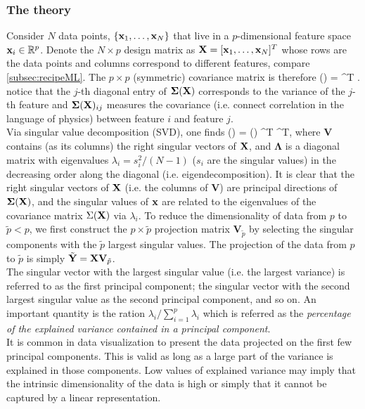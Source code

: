 \subsubsection{The theory}
\label{subsubsec:dimRedPCAtheory}
Consider $N$ data points, $\{\mathbf{x}_1,\dots,\mathbf{x}_N\}$ that live in a $p$-dimensional feature space $\mathbf{x}_i \in \mathbb{R}^p$. Denote the $N\times p$ design matrix as $\mathbf{X} = [\mathbf{x}_1,\dots,\mathbf{x}_N]^T$ whose rows are the data points and columns correspond to different features, compare \ref{subsec:recipeML}. The $p\times p$ (symmetric) covariance matrix is therefore 
\be 
\label{eq:dimRedPCAcovMatrix}
\mathbf{\Sigma}(\mX) =  \mX^T \mX.
\ee 
notice that the $j$-th diagonal entry of $\mathbf{\Sigma}(\mathbf{X})$ corresponds to the variance of the $j$-th feature and $\mathbf{\Sigma}(\mathbf{X})_{ij}$ measures the covariance (i.e. connect correlation in the language of physics) between feature $i$ and feature $j$.\\
Via singular value decomposition (SVD), one finds
\be 
\mathbf{\Sigma}(\mX) =  \left(\right) ^T \equiv {}\mathbf{\Lambda} ^T,
\ee 
where $\mathbf{V}$ contains (as its columns) the right singular vectors of $\mathbf{X}$, and $\mathbf{\Lambda}$ is a diagonal matrix with eigenvalues $\lambda_i =s^2_i/(N-1)$ ($s_i$ are the singular values) in the decreasing order along the diagonal (i.e. eigendecomposition). It is clear that the right singular vectors of $\mathbf{X}$ (i.e. the columns of $\mathbf{V}$) are principal directions of $\mathbf{\Sigma}(\mathbf{X})$, and the singular values of $\mathbf{x}$ are related to the eigenvalues of the covariance matrix $\Sigma(\mathbf{X})$ via $\lambda_i$. To reduce the dimensionality of data from $p$ to $\tilde{p}<p$, we first construct the $p\times \tilde{p}$ projection matrix $\mathbf{V}_{\tilde{p}}$ by selecting the singular components with the $\tilde{p}$ largest singular values. The projection of the data from $p$ to $\tilde{p}$ is simply $\tilde{\mathbf{Y}}=\mathbf{X} \mathbf{V}_{\tilde{p}}$. \\
The singular vector with the largest singular value (i.e. the largest variance) is referred to as the first principal component; the singular vector with the second largest singular value as the second principal component, and so on. An important quantity is the ration $\lambda_i/\sum_{i=1}^p \lambda_i$ which is referred as the \emph{percentage of the explained variance contained in a principal component}.\\
It is common in data visualization to present the data projected on the first few principal components. This is valid as long as a large part of the variance is explained in those components. Low values of explained variance may imply that the intrinsic dimensionality of the data is high or simply that it cannot be captured by a linear representation.

